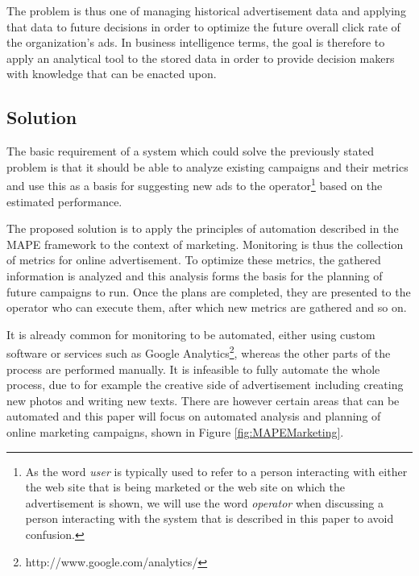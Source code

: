 \documentclass{sig-alternate}
\begin{document}
The problem is thus one of managing historical advertisement data and applying that data to future decisions in order to optimize the future overall click rate of the organization's ads. In business intelligence terms, the goal is therefore to apply an analytical tool to the stored data in order to provide decision makers with knowledge that can be enacted upon.

\subsection{Solution}
The basic requirement of a system which could solve the previously stated problem is that it should be able to analyze existing campaigns and their metrics and use this as a basis for suggesting new ads to the operator\footnote{As the word \emph{user} is typically used to refer to a person interacting with either the web site that is being marketed or the web site on which the advertisement is shown, we will use the word \emph{operator} when discussing a person interacting with the system that is described in this paper to avoid confusion.} based on the estimated performance.

The proposed solution is to apply the principles of automation described in the MAPE framework to the context of marketing. Monitoring is thus the collection of metrics for online advertisement. To optimize these metrics, the gathered information is analyzed and this analysis forms the basis for the planning of future campaigns to run. Once the plans are completed, they are presented to the operator who can execute them, after which new metrics are gathered and so on.

It is already common for monitoring to be automated, either using custom software or services such as Google Analytics\footnote{http://www.google.com/analytics/}, whereas the other parts of the process are performed manually. It is infeasible to fully automate the whole process, due to for example the creative side of advertisement including creating new photos and writing new texts. There are however certain areas that can be automated and this paper will focus on automated analysis and planning of online marketing campaigns, shown in Figure \ref{fig:MAPEMarketing}.
\end{document}
